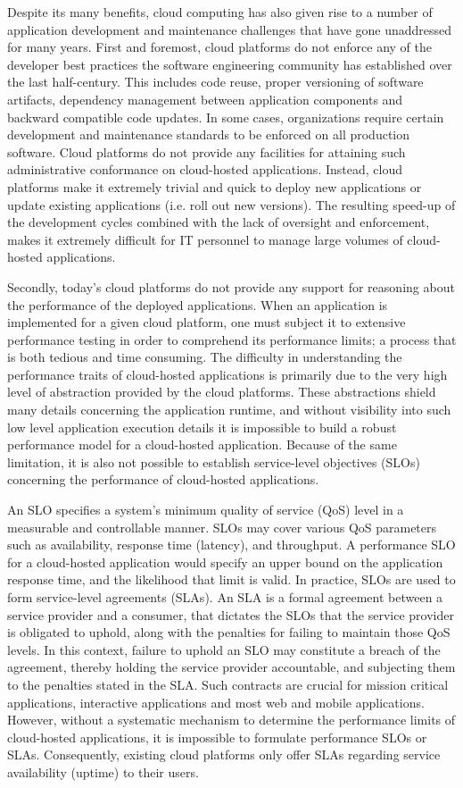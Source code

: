 Despite its many benefits, cloud computing has also given rise to a number of application
development and maintenance challenges that have gone unaddressed for many years. 
First and foremost, cloud platforms do not enforce any of the developer best practices
the software engineering community has established over the last half-century. This
includes code reuse, proper versioning of software artifacts, dependency management
between application components and backward compatible code updates. In
some cases, organizations require certain development and maintenance standards to be enforced on
all production software. Cloud platforms do not provide any facilities for attaining
such administrative conformance on cloud-hosted applications. Instead, cloud platforms
make it extremely trivial and quick to deploy new applications or update existing
applications (i.e. roll out new versions). The resulting speed-up of the development cycles combined with the lack of 
oversight and enforcement, makes it extremely difficult for 
IT personnel to manage large volumes of cloud-hosted applications.

Secondly, today's cloud platforms do not provide any support for reasoning about the 
performance of the deployed applications. When an application is implemented for
a given cloud platform, one must subject it to extensive performance testing in order
to comprehend its performance limits; a process that is both 
tedious and time consuming. The difficulty in understanding the performance 
traits of cloud-hosted applications is primarily due to the very high level of 
abstraction provided by the cloud platforms. These abstractions shield many details 
concerning the application runtime, and without visibility into such low level application 
execution details it is impossible
to build a robust performance model for a cloud-hosted application. Because of the same
limitation, it is also not possible to establish service-level objectives (SLOs) concerning
the performance of cloud-hosted applications. 

An SLO specifies a system's minimum quality of service (QoS) level in a measurable and
controllable manner. SLOs may cover various QoS
parameters such as availability, response time (latency), and throughput. A performance SLO for 
a cloud-hosted application
would specify an upper bound on the application response time, and the likelihood that limit is valid.
In practice, SLOs are used to form service-level agreements (SLAs).
An SLA is a formal agreement between a service provider and a consumer, that dictates the SLOs 
that the service provider is obligated to uphold, along with the 
penalties for failing to maintain those QoS levels. In this context, failure to uphold an
SLO may constitute a breach of the agreement, thereby holding the service provider accountable,
and subjecting them to the penalties stated in the SLA. Such contracts are crucial for
mission critical applications, interactive applications and most web and mobile applications.
However, without a systematic mechanism to determine the performance limits of cloud-hosted
applications, it is impossible to formulate performance SLOs or SLAs.
Consequently, existing cloud platforms only offer SLAs regarding service availability (uptime)
to their users. 

